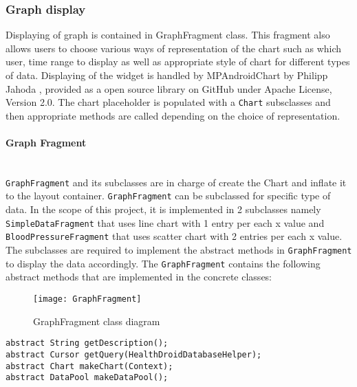 \subsubsection{Graph display}
Displaying of graph is contained in GraphFragment class. This fragment also allows users to choose various ways of
representation of the chart such as which user, time range to display as well as appropriate style of chart for
different types of data. Displaying of the widget is handled by MPAndroidChart by Philipp Jahoda \cite{MPAndroidChart},
provided as a open source library on GitHub under Apache License, Version 2.0. The chart placeholder is populated with a
\texttt{Chart} subsclasses and then appropriate methods are called depending on the choice of representation.

\paragraph{Graph Fragment}\mbox{} \\
\texttt{GraphFragment} and its subclasses are in charge of create the Chart and inflate it to the layout container.
\texttt{GraphFragment} can be subclassed for specific type of data. In the scope of this project, it is implemented in 2
subclasses namely \texttt{SimpleDataFragment} that uses line chart with 1 entry per each x value and
\texttt{BloodPressureFragment} that uses scatter chart with 2 entries per each x value. The subclasses are required to
implement the abstract methods in \texttt{GraphFragment} to display the data accordingly.  The \texttt{GraphFragment}
contains the following abstract methods that are implemented in the concrete classes:

\begin{figure}[!ht]
    \caption{GraphFragment class diagram}
    \centering
    \texttt{[image: GraphFragment]}
\end{figure}

\begin{lstlisting}
abstract String getDescription();
abstract Cursor getQuery(HealthDroidDatabaseHelper);
abstract Chart makeChart(Context);
abstract DataPool makeDataPool();
\end{lstlisting}

